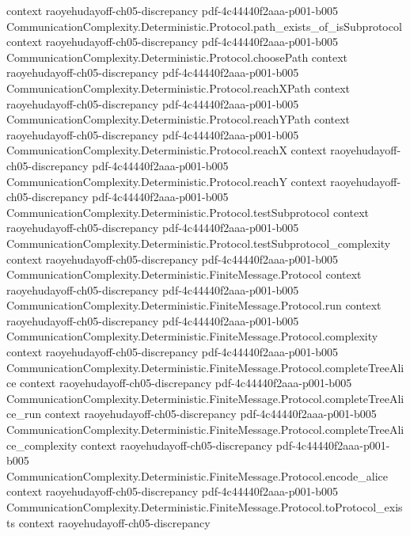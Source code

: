 \begin{lemma}
  {context}
  {raoyehudayoff-ch05-discrepancy}
  {pdf-4c44440f2aaa-p001-b005}
\proofstep
  {CommunicationComplexity.Deterministic.Protocol.path_exists_of_isSubprotocol}
  {context}
  {raoyehudayoff-ch05-discrepancy}
  {pdf-4c44440f2aaa-p001-b005}
\proofstep
  {CommunicationComplexity.Deterministic.Protocol.choosePath}
  {context}
  {raoyehudayoff-ch05-discrepancy}
  {pdf-4c44440f2aaa-p001-b005}
\proofstep
  {CommunicationComplexity.Deterministic.Protocol.reachXPath}
  {context}
  {raoyehudayoff-ch05-discrepancy}
  {pdf-4c44440f2aaa-p001-b005}
\proofstep
  {CommunicationComplexity.Deterministic.Protocol.reachYPath}
  {context}
  {raoyehudayoff-ch05-discrepancy}
  {pdf-4c44440f2aaa-p001-b005}
\proofstep
  {CommunicationComplexity.Deterministic.Protocol.reachX}
  {context}
  {raoyehudayoff-ch05-discrepancy}
  {pdf-4c44440f2aaa-p001-b005}
\proofstep
  {CommunicationComplexity.Deterministic.Protocol.reachY}
  {context}
  {raoyehudayoff-ch05-discrepancy}
  {pdf-4c44440f2aaa-p001-b005}
\proofstep
  {CommunicationComplexity.Deterministic.Protocol.testSubprotocol}
  {context}
  {raoyehudayoff-ch05-discrepancy}
  {pdf-4c44440f2aaa-p001-b005}
\proofstep
  {CommunicationComplexity.Deterministic.Protocol.testSubprotocol_complexity}
  {context}
  {raoyehudayoff-ch05-discrepancy}
  {pdf-4c44440f2aaa-p001-b005}
\proofstep
  {CommunicationComplexity.Deterministic.FiniteMessage.Protocol}
  {context}
  {raoyehudayoff-ch05-discrepancy}
  {pdf-4c44440f2aaa-p001-b005}
\proofstep
  {CommunicationComplexity.Deterministic.FiniteMessage.Protocol.run}
  {context}
  {raoyehudayoff-ch05-discrepancy}
  {pdf-4c44440f2aaa-p001-b005}
\proofstep
  {CommunicationComplexity.Deterministic.FiniteMessage.Protocol.complexity}
  {context}
  {raoyehudayoff-ch05-discrepancy}
  {pdf-4c44440f2aaa-p001-b005}
\proofstep
  {CommunicationComplexity.Deterministic.FiniteMessage.Protocol.completeTreeAlice}
  {context}
  {raoyehudayoff-ch05-discrepancy}
  {pdf-4c44440f2aaa-p001-b005}
\proofstep
  {CommunicationComplexity.Deterministic.FiniteMessage.Protocol.completeTreeAlice_run}
  {context}
  {raoyehudayoff-ch05-discrepancy}
  {pdf-4c44440f2aaa-p001-b005}
\proofstep
  {CommunicationComplexity.Deterministic.FiniteMessage.Protocol.completeTreeAlice_complexity}
  {context}
  {raoyehudayoff-ch05-discrepancy}
  {pdf-4c44440f2aaa-p001-b005}
\proofstep
  {CommunicationComplexity.Deterministic.FiniteMessage.Protocol.encode_alice}
  {context}
  {raoyehudayoff-ch05-discrepancy}
  {pdf-4c44440f2aaa-p001-b005}
\proofstep
  {CommunicationComplexity.Deterministic.FiniteMessage.Protocol.toProtocol_exists}
  {context}
  {raoyehudayoff-ch05-discrepancy}

\end{lemma}
